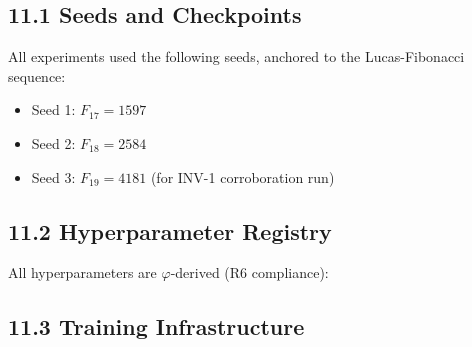 \subsection{11.1 Seeds and Checkpoints}

All experiments used the following seeds, anchored to the Lucas-Fibonacci
sequence:
\begin{itemize}
  \item Seed 1: \(F_{17} = 1597\)
  \item Seed 2: \(F_{18} = 2584\)
  \item Seed 3: \(F_{19} = 4181\) (for INV-1 corroboration run)
\end{itemize}

\subsection{11.2 Hyperparameter Registry}

All hyperparameters are \(\varphi\)-derived (R6 compliance):
\begin{table}[H]
\centering
\caption{Complete \(\varphi\)-Momentum Schedule Hyperparameter Registry.}
\label{tab:28-hyperparams}
\end{table}

\subsection{11.3 Training Infrastructure}

